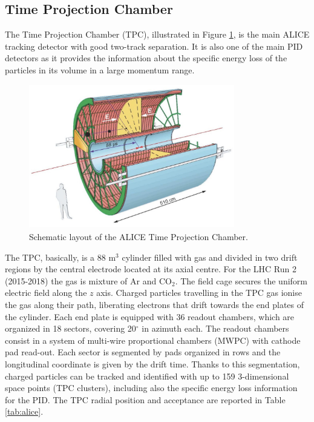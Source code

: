 %
\subsection{Time Projection Chamber} \label{sec:tpc}

The Time Projection Chamber (TPC), illustrated in Figure \ref{fig:tpc}, is the main ALICE
tracking detector with good two-track separation. It is also one of the main PID detectors as it
provides the information about the specific energy loss of the particles in its volume in a large
momentum range. 

\begin{figure}
    \captionsetup{justification=centering}
    \centering
    \includegraphics[width=0.8\textwidth]{gfx/tpc}
	\caption{Schematic layout of the ALICE Time Projection Chamber.}
	\label{fig:tpc}
\end{figure}

The TPC, basically, is a 88 m$^3$ cylinder filled with gas and divided in two drift regions by the
central electrode located at its axial centre. 
For the LHC Run 2 (2015-2018) the gas is mixture of Ar and CO$_2$.
The field cage secures the uniform electric field along the $z$ axis.
Charged particles travelling in the TPC gas ionise the gas along their path, liberating electrons 
that drift towards the end plates of the cylinder. 
Each end plate is equipped with 36 readout chambers, which are organized in 18 sectors, covering 
20$^{\circ}$ in azimuth each. 
The readout chambers consist in a system of multi-wire proportional chambers (MWPC) with cathode pad
read-out. Each sector is segmented by pads organized in rows and the longitudinal coordinate is given
by the drift time. 
Thanks to this segmentation, charged particles can be tracked and identified with up to 159 
3-dimensional space points (TPC clusters), including also the specific energy loss information
for the PID. The TPC radial position and acceptance are reported in Table \ref{tab:alice}.

